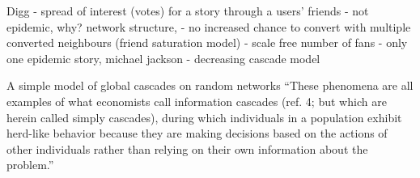 Digg
- spread of interest (votes) for a story through a users' friends
- not epidemic, why? network structure, 
- no increased chance to convert with multiple converted neighbours (friend saturation model)
- scale free number of fans
- only one epidemic story, michael jackson
- decreasing cascade model

A simple model of global cascades on
random networks
``These phenomena are all examples of what economists call
information cascades (ref. 4; but which are herein called simply
cascades), during which individuals in a population exhibit
herd-like behavior because they are making decisions based on
the actions of other individuals rather than relying on their own
information about the problem.''

